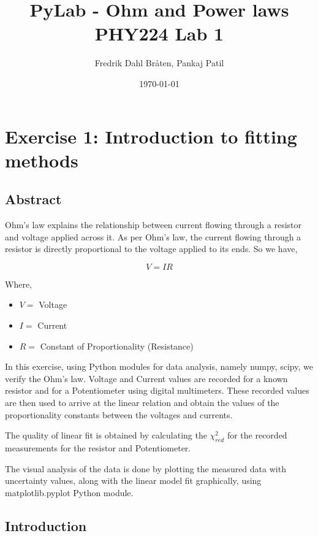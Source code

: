 \documentclass[letterpaper,12pt]{article}
\begin{document}
\title{%
PyLab - Ohm and Power laws \\
\large PHY224 Lab 1}
\author{Fredrik Dahl Bråten, Pankaj Patil}
\date{\today}
\maketitle
\tableofcontents
\listoffigures
\listoftables

\pagebreak

\section{Exercise 1:  Introduction to fitting methods}

\subsection{Abstract}

Ohm's law explains the relationship between current flowing through a resistor and voltage applied across it.
As per Ohm's law, the current flowing through a resistor is directly proportional to the
voltage applied to its ends. So we have,

$$V = IR$$

Where,
\begin{itemize}
  \item[] $V=$ Voltage
  \item[] $I=$ Current
  \item[] $R=$ Constant of Proportionality (Resistance)
\end{itemize}

In this exercise, using Python modules for data analysis, namely numpy, scipy, we 
verify the Ohm's law. Voltage and Current values are recorded for a known resistor 
and for a Potentiometer using digital multimeters. These recorded values are then
used to arrive at the linear relation and obtain the values of the proportionality constants  between
the voltages and currents. 

The quality of linear fit is obtained by calculating the $\chi^2_{red}$ for the recorded measurements 
for the resistor and Potentiometer. 

The visual analysis of the data is done by plotting the measured data with uncertainty values, along with the linear model
fit graphically, using matplotlib.pyplot Python module.

\subsection{Introduction}
\end{document}
